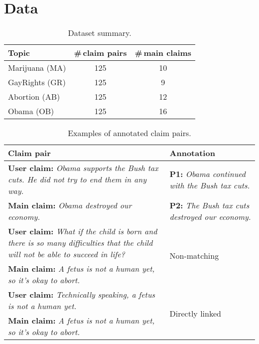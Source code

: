 \section{Data}
\label{sec:argpremise_dataset}

\begin{table}
\begin{center}
{\small
\begin{tabular}{lcc}
\toprule
Topic & \#\,claim pairs  & \#\,main claims \\
\midrule
Marijuana (MA)	   & 125                     &  10                    \\
GayRights (GR)	   & 125                     &  9                     \\
Abortion (AB)	   & 125                     &  12                    \\
Obama (OB)	       & 125                     &  16 \\
\bottomrule
\end{tabular}}
\caption{Dataset summary. }
\label{tab:argpremise_topic_distribution}
\end{center}
\end{table}


\begin{table}
{\small
\begin{tabular}{@{}p{}p{}@{}}
\toprule
Claim pair & Annotation            \\
\midrule
 \textbf{User claim:} \emph{Obama supports the Bush tax cuts. He did not try to end them in any way.} & \textbf{P1:}  \emph{Obama continued with the Bush tax cuts.}      \\
 \textbf{Main claim:} \emph{Obama destroyed our economy.}  & \textbf{P2:} \emph{The Bush tax cuts destroyed our economy.}   \\
\midrule
 \textbf{User claim:} \emph{What if the child is born and there is so many difficulties that the child will not be able to succeed in life?}  & \multirow{2}{*}{Non-matching}   \\
 \textbf{Main claim:} \emph{A fetus is not a human yet, so it's okay to abort.}   &   \\
\midrule
 \textbf{User claim:} \emph{Technically speaking, a fetus is not a human yet.} & \multirow{2}{*}{Directly linked}      \\
 \textbf{Main claim:} \emph{A fetus is not a human yet, so it's okay to abort.}     & \\
\bottomrule
\end{tabular}}
\caption{Examples of annotated claim pairs.}
\label{tab:argpremises_example}
\end{table}


